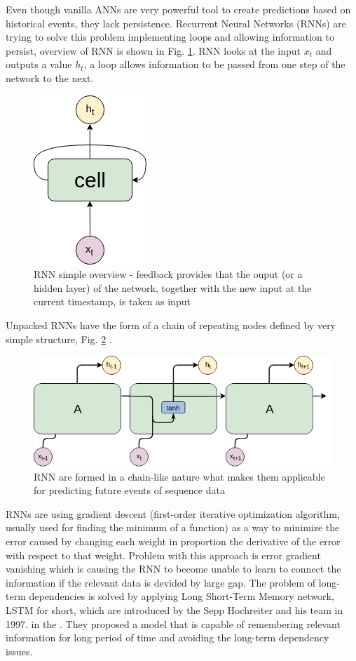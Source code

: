\documentclass[10pt, a4paper]{article} %
\begin{document}
Even though vanilla ANNs are very powerful tool to create predictions based on historical events, they lack persistence. 
Recurrent Neural Networks (RNNs) are trying to solve this problem implementing loops and allowing information to persist, overview of RNN is shown in Fig. \ref{rnn}. RNN looks at the input $ x_{t} $ and outputs a value $ h_{t} $, a loop allows information to be passed from one step of the network to the next. 
\begin{figure}
	\centering
	\includegraphics[scale=.5]{images/RNN.png} %
	\caption{RNN simple overview - feedback provides that the ouput (or a hidden layer) of the network, together with the new input at the current timestamp, is taken as input}
	\label{rnn} 
\end{figure}
Unpacked RNNs have the form of a chain of repeating nodes defined by very simple structure, Fig. \ref{rnn-unpacked} \cite{Olah_lstm}.
\begin{figure}
	\centering
	\includegraphics[scale=.5]{images/RNN-unpacked.png} %
	\caption{RNN are formed in a chain-like nature what makes them applicable for predicting future events of sequence data}
	\label{rnn-unpacked} 
\end{figure}

RNNs are using gradient descent (first-order iterative optimization algorithm, usually used for finding the minimum of a function) as a way to minimize the error caused by changing each weight in proportion the derivative of the error with respect to that weight. Problem with this approach is error gradient vanishing which is causing the RNN to become unable to learn to connect the information if the relevant data is devided by large gap. 
The problem of long-term dependencies is solved by applying Long Short-Term Memory network, LSTM for short, which are introduced by the Sepp Hochreiter and his team in 1997. in the \cite{Hochreiter_LSTM}. They proposed a model that is capable of remembering relevant information for long period of time and avoiding the long-term dependency issues. 
\end{document}
